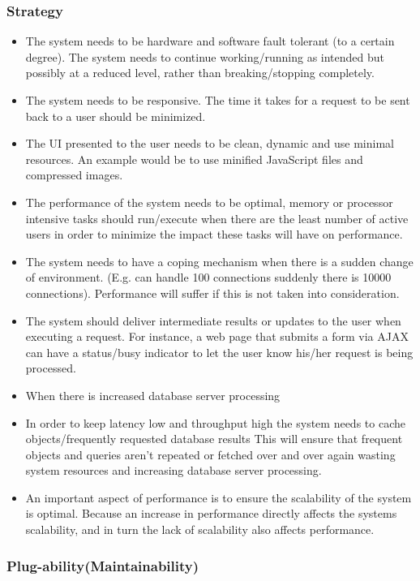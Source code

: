 \documentclass[a4paper,12pt,titlepage]{article}
\begin{document}
	\subsubsection*{Strategy}
	\begin{itemize}
		\item The system needs to be hardware and software fault tolerant (to a certain degree). The system needs to continue working/running as intended but possibly at a reduced level, rather than breaking/stopping completely.
		\item The system needs to be responsive. The time it takes for a request to be sent back to a user should be minimized. 
		\item The UI presented to the user needs to be clean, dynamic and use minimal resources. An example would be to use minified JavaScript files and compressed images.
		\item The performance of the system needs to be optimal, memory or processor intensive tasks should run/execute when there are the least number of active users in order to minimize the impact these tasks will have on performance.
		\item The system needs to have a coping mechanism when there is a sudden change of environment. (E.g. can handle 100 connections suddenly there is 10000 connections). Performance will suffer if this is not taken into consideration.
		\item The system should deliver intermediate results or updates to the user when executing a request. For instance, a web page that submits a form via AJAX can have a status/busy indicator to let the user know his/her request is being processed.
		\item When there is increased database server processing 
		\item In order to keep latency low and throughput high the system needs to cache objects/frequently requested database results This will ensure that frequent objects and queries aren't repeated or fetched over and over again wasting system resources and increasing database server processing.
		\item An important aspect of performance is to ensure the scalability of the system is optimal. Because an increase in performance directly affects the systems scalability, and in turn the lack of scalability also affects performance.
	\end{itemize}
	\newpage
\subsubsection{Plug-ability(Maintainability)}%
	
	\newpage
\end{document}
